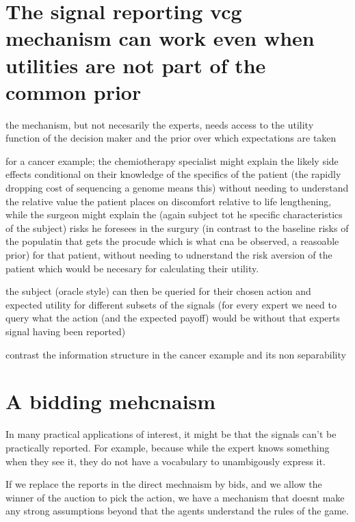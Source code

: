 \section{The signal reporting vcg mechanism can work even when utilities are not part of the common prior}

the mechanism, but not necesarily the experts, needs access to the utility function of the decision maker and the prior over which expectations are taken 


for a cancer example; the chemiotherapy specialist might explain the likely side effects conditional on their knowledge of the specifics of the patient (the rapidly dropping cost of sequencing a genome means this) without needing to understand the relative value the patient places on discomfort relative to life lengthening, while the surgeon might explain the (again subject tot he specific characteristics of the subject) risks he foresees in the surgury (in contrast to the baseline risks of the populatin that gets the procude which is what cna be observed, a reasoable prior) for that patient, without needing to udnerstand the risk aversion of the patient which would be necesary for calculating their utility.

the subject (oracle style) can then be queried for their chosen action and expected utility for different subsets of the signals (for every expert we need to query what the action (and the expected payoff) would be without that experts signal having been reported)

contrast the information structure in the cancer example and its non separability 


\section{A bidding mehcnaism }

In many practical applications of interest, it might be that the signals can't be practically reported. For example, because while the expert knows something when they see it, they do not have a vocabulary to unambigously express it. 


If we replace the reports in the direct mechnaism by bids, and we allow the winner of the auction to pick the action, we have a mechanism that doesnt make any strong assumptions beyond that the agents understand the rules of the game.


